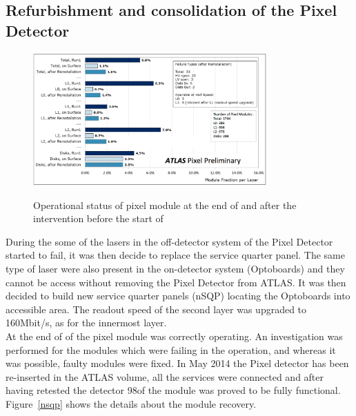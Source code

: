 \subsection{Refurbishment and consolidation of the Pixel Detector}
\begin{figure}
\includegraphics[width=0.8\textwidth]{Images/atlas/pixel_nsqp_performance.png}
\label{fig:nsqp}
\caption{Operational status of pixel module at the end of \runone and after the intervention before the start of \runtwo}
\end{figure}
During the \runone some of the lasers in the off-detector system of the Pixel Detector started to fail, it was then decide to replace the service quarter panel. The same type of laser were also present in the on-detector system (Optoboards) and they cannot be access without removing the Pixel Detector from ATLAS. It was then decided to build new service quarter panels (nSQP) locating the Optoboards into accessible area. The readout speed of the second layer was upgraded to 160Mbit/s, as for the innermost layer.\\
At the end of \percent of the pixel module was correctly operating. An investigation was performed for the modules which were failing in the operation, and whereas it was possible, faulty modules were fixed. In May 2014 the Pixel detector has been re-inserted in the ATLAS volume, all the services were connected and after having retested the detector 98\percent of the module was proved to be fully functional. Figure~\ref{nsqp} shows the details about the module recovery.


